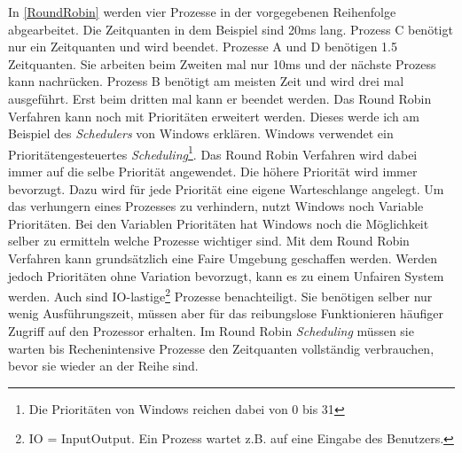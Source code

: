 In \ref{RoundRobin} werden vier Prozesse in der vorgegebenen Reihenfolge abgearbeitet. Die Zeitquanten in dem Beispiel sind 20ms lang. Prozess C benötigt nur ein Zeitquanten und wird beendet. Prozesse A und D benötigen 1.5 Zeitquanten. Sie arbeiten beim Zweiten mal nur 10ms und der nächste Prozess kann nachrücken. Prozess B benötigt am meisten Zeit und wird drei mal ausgeführt. Erst beim dritten mal kann er beendet werden.
\medskip
\newline
Das Round Robin Verfahren kann noch mit Prioritäten erweitert werden. Dieses werde ich am Beispiel des \textit{Schedulers} von Windows erklären. Windows verwendet ein Prioritätengesteuertes \textit{Scheduling}\footnote{Die Prioritäten von Windows reichen dabei von 0 bis 31}. Das Round Robin Verfahren wird dabei immer auf die selbe Priorität angewendet. Die höhere Priorität wird immer bevorzugt. Dazu wird für jede Priorität eine eigene Warteschlange angelegt. Um das verhungern eines Prozesses zu verhindern, nutzt Windows noch Variable Prioritäten. Bei den Variablen Prioritäten hat Windows noch die Möglichkeit selber zu ermitteln welche Prozesse wichtiger sind.
\medskip
\newline
Mit dem Round Robin Verfahren kann grundsätzlich eine Faire Umgebung geschaffen werden. Werden jedoch Prioritäten ohne Variation bevorzugt, kann es zu einem Unfairen System werden. Auch sind I\/O-lastige\footnote{I\/O = Input\/Output. Ein Prozess wartet z.B. auf eine Eingabe des Benutzers.} Prozesse benachteiligt. Sie benötigen selber nur wenig Ausführungszeit, müssen aber für das reibungslose Funktionieren häufiger Zugriff auf den Prozessor erhalten. Im Round Robin \textit{Scheduling} müssen sie warten bis Rechenintensive Prozesse den Zeitquanten vollständig verbrauchen, bevor sie wieder an der Reihe sind.

